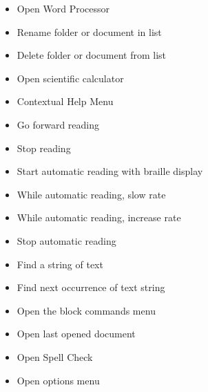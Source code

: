 \documentclass[10pt,letterpaper,twoside]{report}
\begin{document}
\begin{enumerate}
\begin{itemize}
		      \item Open Word Processor 
		      \item Rename folder or document in list 
		      \item Delete folder or document from list 
		      \item Open scientific calculator 
		      \item Contextual Help Menu 
		      \item Go forward reading 
		      \item Stop reading 
		      \item Start automatic reading with braille display 
		      \item While automatic reading, slow rate 
		      \item While automatic reading, increase rate 
		      \item Stop automatic reading 
		      \item Find a string of text 
		      \item Find next occurrence of text string 
		      \item Open the block commands menu 
		      \item Open last opened document 
		      \item Open Spell Check 
		      \item Open options menu 

\end{itemize}
\end{enumerate}
\end{document}
